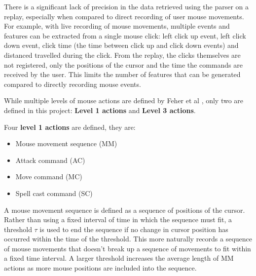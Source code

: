 \documentclass{SizheArticle}
\begin{document}
There is a significant lack of precision in the data retrieved using the parser on a replay, especially when compared to direct recording of user mouse movements. For example, with live recording of mouse movements, multiple events and features can be extracted from a single mouse click: left click up event, left click down event, click time (the time between click up and click down events) and distanced travelled during the click. From the replay, the clicks themselves are not registered, only the positions of the cursor and the time the commands are received by the user. This limits the number of features that can be generated compared to directly recording mouse events.

While multiple levels of mouse actions are defined by Feher et al \cite{mouse-dynamics}, only two are defined in this project: \textbf{Level 1 actions} and \textbf{Level 3 actions}.

Four \textbf{level 1 actions} are defined, they are:
\begin{itemize}
\item Mouse movement sequence (MM)
\item Attack command (AC)
\item Move command (MC)
\item Spell cast command (SC)
\end{itemize}
A mouse movement sequence is defined as a sequence of positions of the cursor. Rather than using a fixed interval of time in which the sequence must fit, a threshold $\tau$ is used to end the sequence if no change in cursor position has occurred within the time of the threshold. This more naturally records a sequence of mouse movements that doesn't break up a sequence of movements to fit within a fixed time interval. A larger threshold increases the average length of MM actions as more mouse positions are included into the sequence. 
\end{document}
